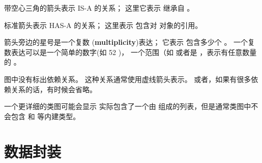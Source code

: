 
带空心三角的箭头表示 IS-A 的关系； 这里它表示  继承自  。


标准箭头表示 HAS-A 的关系； 这里表示  包含对  对象的引用。



箭头旁边的星号是一个复数 ({\bf multiplicity})表达；  
它表示  包含多少个 。  
一个复数表达可以是一个简单的数字(如 52 )， 
一个范围（如  或者是 \li{*}，表示有任意数量的  。


图中没有标出依赖关系。  这种关系通常使用虚线箭头表示。  
或者，如果有很多依赖关系的话，有时候会省略。  


一个更详细的类图可能会显示  实际包含了一个由  组成的列表，但是通常类图中不会包含  和  等内建类型。


\section{数据封装}


